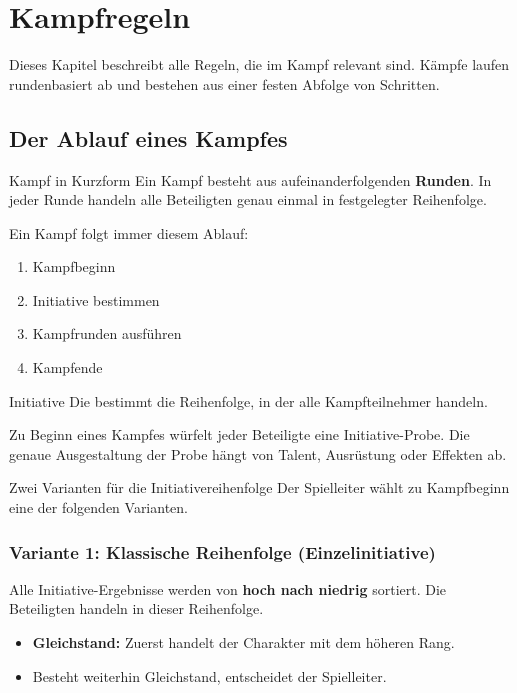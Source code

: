 \chapter{Kampfregeln}

Dieses Kapitel beschreibt alle Regeln, die im Kampf relevant sind. Kämpfe laufen
rundenbasiert ab und bestehen aus einer festen Abfolge von Schritten.

\section{Der Ablauf eines Kampfes}

\begin{rulebox}{Kampf in Kurzform}
	Ein Kampf besteht aus aufeinanderfolgenden \textbf{Runden}.  
	In jeder Runde handeln alle Beteiligten genau einmal in festgelegter Reihenfolge.
\end{rulebox}

Ein Kampf folgt immer diesem Ablauf:
\begin{enumerate}
	\item Kampfbeginn
	\item Initiative bestimmen
	\item Kampfrunden ausführen
	\item Kampfende
\end{enumerate}

\begin{rulebox}{Initiative}
	Die  bestimmt die Reihenfolge, in der alle
	Kampfteilnehmer handeln.
\end{rulebox}

Zu Beginn eines Kampfes würfelt jeder Beteiligte eine Initiative-Probe.
Die genaue Ausgestaltung der Probe hängt von Talent, Ausrüstung oder Effekten ab.

\begin{rulebox}{Zwei Varianten für die Initiativereihenfolge}
	Der Spielleiter wählt zu Kampfbeginn eine der folgenden Varianten.
\end{rulebox}

\subsection*{Variante 1: Klassische Reihenfolge (Einzelinitiative)}
Alle Initiative-Ergebnisse werden von \textbf{hoch nach niedrig} sortiert.
Die Beteiligten handeln in dieser Reihenfolge.

\begin{itemize}
	\item \textbf{Gleichstand:} Zuerst handelt der Charakter mit dem höheren Rang.
	\item Besteht weiterhin Gleichstand, entscheidet der Spielleiter.
\end{itemize}

